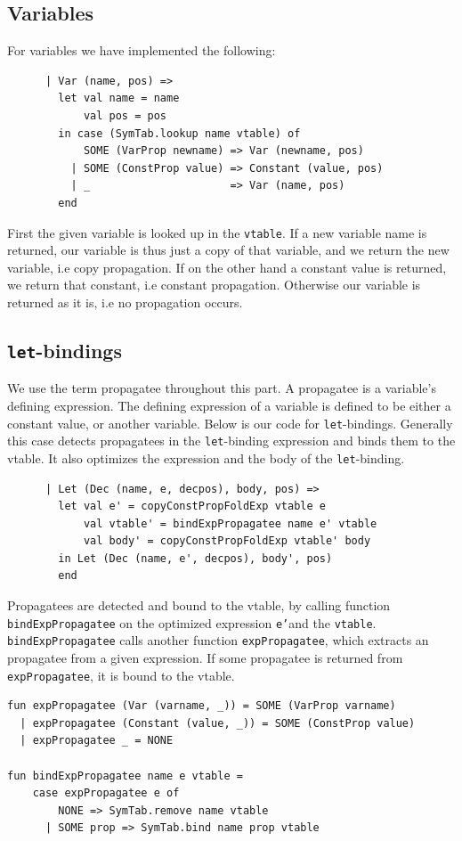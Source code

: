 \documentclass[11pt]{article}
\begin{document}
	\subsection{Variables}
	For variables we have implemented the following:
	\begin{lstlisting}
      | Var (name, pos) =>
        let val name = name
            val pos = pos
        in case (SymTab.lookup name vtable) of
            SOME (VarProp newname) => Var (newname, pos)
          | SOME (ConstProp value) => Constant (value, pos)
          | _                      => Var (name, pos)
        end
	\end{lstlisting}
	First the given variable is looked up in the \texttt{vtable}. If a new variable name is returned, our
	variable is thus just a copy of that variable, and we return the new variable, i.e copy propagation. If
	on the other hand a constant value is returned, we return that constant, i.e constant propagation.
	Otherwise our variable is returned as it is, i.e no propagation occurs.
	\subsection{\texttt{let}-bindings}
	We use the term propagatee throughout this part. A propagatee is a variable's defining expression. The
	defining expression of a variable is defined to be either a constant value, or another variable. Below is
	our code for \texttt{let}-bindings. Generally this case detects propagatees in the
	\texttt{let}-binding expression and binds them to the vtable. It also optimizes the expression and the
	body of the \texttt{let}-binding.
	\begin{lstlisting}
      | Let (Dec (name, e, decpos), body, pos) =>
        let val e' = copyConstPropFoldExp vtable e
            val vtable' = bindExpPropagatee name e' vtable
            val body' = copyConstPropFoldExp vtable' body
        in Let (Dec (name, e', decpos), body', pos)
        end
	\end{lstlisting}
	Propagatees are detected and bound to the vtable, by calling function \texttt{bindExpPropagatee} on the optimized expression
	\texttt{e'}and the \texttt{vtable}. \texttt{bindExpPropagatee} calls another function \texttt{expPropagatee}, which extracts
	an propagatee from a given expression. If some propagatee is returned from \texttt{expPropagatee}, it is bound to the vtable.
	\begin{lstlisting}
fun expPropagatee (Var (varname, _)) = SOME (VarProp varname)
  | expPropagatee (Constant (value, _)) = SOME (ConstProp value)
  | expPropagatee _ = NONE

fun bindExpPropagatee name e vtable =
    case expPropagatee e of
        NONE => SymTab.remove name vtable
      | SOME prop => SymTab.bind name prop vtable
	\end{lstlisting}
\end{document}
